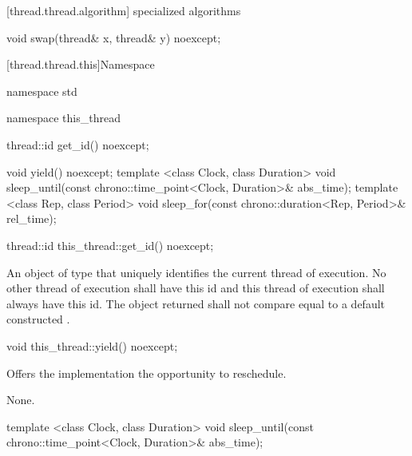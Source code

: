 [thread.thread.algorithm]{ specialized algorithms}

%
%
\begin{itemdecl}
void swap(thread& x, thread& y) noexcept;
\end{itemdecl}

\begin{itemdescr}
\pnum\effects {}
\end{itemdescr}

[thread.thread.this]{Namespace }

\begin{codeblock}
namespace std {
  namespace this_thread {
    thread::id get_id() noexcept;

    void yield() noexcept;
    template <class Clock, class Duration>
      void sleep_until(const chrono::time_point<Clock, Duration>& abs_time);
    template <class Rep, class Period>
      void sleep_for(const chrono::duration<Rep, Period>& rel_time);
  }
}
\end{codeblock}

%
%
\begin{itemdecl}
thread::id this_thread::get_id() noexcept;
\end{itemdecl}

\begin{itemdescr}
\pnum
\returns An object of type  that uniquely identifies the current thread of
execution. No other thread of execution shall have this id and this thread of execution shall
always have this id. The object returned shall not compare equal to a default constructed
.
\end{itemdescr}

%
%
\begin{itemdecl}
void this_thread::yield() noexcept;
\end{itemdecl}

\begin{itemdescr}
\pnum
\effects Offers the implementation the opportunity to reschedule.

\pnum
\sync None.
\end{itemdescr}

%
%
\begin{itemdecl}
template <class Clock, class Duration>
  void sleep_until(const chrono::time_point<Clock, Duration>& abs_time);
\end{itemdecl}

